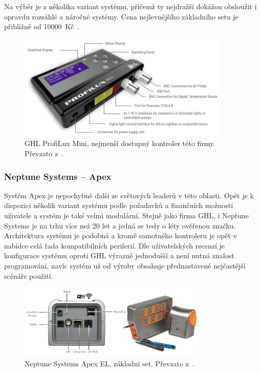             Na výběr je z několika variant systému, přičemž ty nejdražší dokážou obsloužit i opravdu rozsáhlé a náročné systémy. Cena nejlevnějšího základního setu je přibližně od \qty{10000}{Kč}~\cite{ghl-profilux,eshop-ghl-profilux-sets}.

            \begin{figure}[h!]
                \centering
                \includegraphics[width=0.9\textwidth]{obrazky/trh/GHL-ProfiLux-Mini.jpg}
                \caption{GHL ProfiLux Mini, nejmenší dostupný kontroler této firmy. Převzato z~\cite{ghl-profilux}.}
                \label{fig:obrazky-trh-GHL-ProfiLux-Mini-jpg}
            \end{figure}
            
        \subsubsection{Neptune Systems -- Apex}
            Systém Apex je nepochybně další ze světových leaderů v této oblasti. Opět je k dispozici několik variant systému podle požadavků a finančních možností uživatele a systém je také velmi modulární. Stejně jako firma GHL, i Neptune Systems je na trhu více než 20 let a jedná se tedy o léty ověřenou značku. Architektura systému je podobná a kromě samotného kontroleru je opět v nabídce celá řada kompatibilních periferií. Dle uživatelských recenzí je konfigurace systému oproti GHL výrazně jednodušší a není nutná znalost programování, navíc systém už od výroby obsahuje přednastavené nejčastější scénáře použití.

            \begin{figure}[h!]
                \centering
                \includegraphics[width=0.8\textwidth]{obrazky/trh/apex-el.jpg}
                \caption{Neptune Systems Apex EL, základní set. Převzato z~\cite{eshop-neptune-systems-apex}.}
                \label{fig:obrazky-trh-apex-el}
            \end{figure}
            
